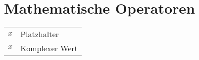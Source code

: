 %
%
%
%
%
%
%
%
%
%
%
%
%
%
\section*{Mathematische Operatoren} 				%
%
\begin{tabular}{ll}
$x$                         & Platzhalter\\
$\underline{x}$             & Komplexer Wert\\
\end{tabular}
%
%
%
%
